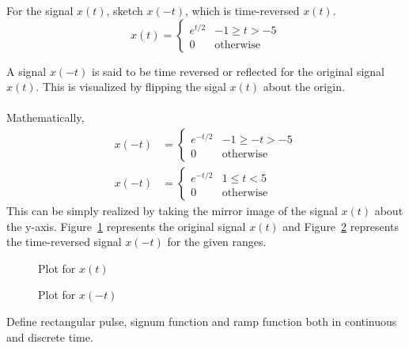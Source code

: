 \documentclass{article}[12 pt]
\begin{document}
\begin{problem}{For the signal $x(t)$, sketch $x(-t)$, which is time-reversed $x(t)$.
\begin{equation*}
x(t)=\begin{cases}
  e^{t/2} & -1\geq t>-5\\
  0 & \text{otherwise}
\end{cases}
\end{equation*}
}\end{problem}
\begin{solution}{A signal $x(-t)$ is said to be time reversed or reflected for the original signal $x(t)$. This is visualized by flipping the sigal $x(t)$ about the origin.\\\\
Mathematically,
\begin{equation*}
\begin{aligned}
x(-t)&=\begin{cases}
  e^{-t/2} & -1\geq -t>-5\\
  0 & \text{otherwise}
\end{cases}\\
x(-t)&=\begin{cases}
  e^{-t/2} & 1\leq t<5\\
  0 & \text{otherwise}
\end{cases}
\end{aligned}
\end{equation*}
This can be simply realized by taking the mirror image of the signal $x(t)$ about the y-axis.
Figure~\ref{fig:tro} represents the original signal $x(t)$ and Figure~\ref{fig:tr} represents the time-reversed signal $x(-t)$ for the given ranges.
\begin{figure}[H]
\centering
{}
\caption{Plot for $x(t)$}
\label{fig:tro}
\end{figure}
\begin{figure}[H]
\centering
{}
\caption{Plot for $x(-t)$}
\label{fig:tr}
\end{figure}
}
\end{solution}
\begin{problem}{Define rectangular pulse, signum function and ramp function both in continuous and discrete time.}\end{problem}
\end{document}
